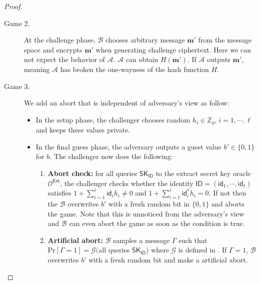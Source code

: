 \documentclass[runningheads,10pt]{llncs}
\def\ZZ{\mathbb{Z}}
\def\cal{\mathcal}
\def\bf{\mathbf}
\def\SK{\mathsf{SK}}
\def\Ext{\mathsf{Ext}}
\def\Pr{\mathrm{Pr}}
\def\ID{\mathsf{ID}}
\def\id{\mathsf{id}}
\def\W{\cal{W}}
\begin{document}
\begin{proof}
\begin{description}
		\item[Game 2.] At the challenge phase, $\cal{B}$ chooses arbitrary message $\bf{m}'$ from the message space and  encrypts $\bf{m}'$ when generating challenge ciphertext. Here we can not expect the behavior of $\cal{A}$. $\cal{A}$ can obtain $H(\bf{m}')$. If $\cal{A}$ outputs $\bf{m}'$, meaning $\cal{A}$ has broken the one-wayness of the hash function $H$. 
		
		
		\item[Game 3.] We add an abort that is independent of adversary's view as follow:
		\begin{itemize}
			\item In the setup phase, the challenger chooses random $h_i\in\ZZ_q$, $i=1,\cdots, \ell$ and keeps these values private.
			\item In the final guess phase, the adversary outputs a guest value $b'\in\{0,1\}$ for $b$. The challenger now does the following:
			\begin{enumerate}
				\item \textbf{Abort check:} for all queries $\SK_\ID$ to the extract secret key oracle $\cal{O}^\Ext$, the challenger checks whether the identity $\ID=(\id_1,\cdots,\id_\ell)$ satisfies $1+\sum_{i=1}^\ell\id_ih_i\ne 0$ and $1+\sum_{i=1}^\ell\id^*_ih_i= 0$. If not then the $\cal{B}$ overwrites $b'$ with a fresh random bit in $\{0,1\}$ and aborts the game. Note that this is unnoticed from the adversary's view and $\cal{B}$ can even abort the game as soon as the condition is true.
				\item \textbf{Artificial abort:} $\cal{B}$ samples a message $\Gamma$ such that $\Pr[\Gamma=1] = \cal{G}($all queries $\SK_\ID)$ where $\cal{G}$ is defined in \cite[Lemma 28]{ABB10-EuroCrypt}. If $\Gamma=1$, $\cal{B}$ overwrites $b'$ with a fresh random bit and make a artificial abort.
			\end{enumerate}    
		\end{itemize}
		

\end{description}
\end{proof}
\end{document}
